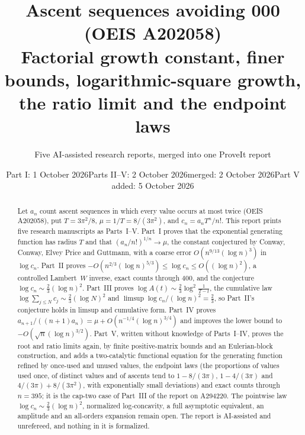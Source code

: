 \documentclass[11pt,letterpaper]{article}
\title{Ascent sequences avoiding 000 (OEIS A202058)\\[4pt]
\large Factorial growth constant, finer bounds, logarithmic-square growth,\\ the ratio limit and the endpoint laws}
\author{Five AI-assisted research reports, merged into one ProveIt report}
\date{Part I: 1 October 2026\quad Parts II--V: 2 October 2026\quad merged: 2 October 2026\quad Part V added: 5 October 2026}
\theoremstyle{remark}
\begin{document}
\hypersetup{pageanchor=false}
\maketitle
\begin{abstract}
Let $a_n$ count ascent sequences in which every value occurs at most twice (OEIS A202058), put $T=3\pi^2/8$, $\mu=1/T=8/(3\pi^2)$, and $c_n=a_nT^n/n!$. This report prints five research manuscripts as Parts~I--V. Part~I proves that the exponential generating function has radius $T$ and that $(a_n/n!)^{1/n}\to\mu$, the constant conjectured by Conway, Conway, Elvey Price and Guttmann, with a coarse error $O(n^{9/13}(\log n)^3)$ in $\log c_n$. Part~II proves $-O(n^{2/3}(\log n)^{5/3})\le\log c_n\le O((\log n)^2)$, a controlled Lambert~$W$ inverse, exact counts through $400$, and the conjecture $\log c_n\sim\frac23(\log n)^2$. Part~III proves $\log A(t)\sim\frac23\log^2\frac1{T-t}$, the cumulative law $\log\sum_{j\le N}c_j\sim\frac23(\log N)^2$ and $\limsup\log c_n/(\log n)^2=\frac23$, so Part~II's conjecture holds in limsup and cumulative form. Part~IV proves $a_{n+1}/((n+1)a_n)=\mu+O(n^{-1/4}(\log n)^{3/4})$ and improves the lower bound to $-O(\sqrt n(\log n)^{3/2})$. Part~V, written without knowledge of Parts~I--IV, proves the root and ratio limits again, by finite positive-matrix bounds and an Eulerian-block construction, and adds a two-catalytic functional equation for the generating function refined by once-used and unused values, the endpoint laws (the proportions of values used once, of distinct values and of ascents tend to $1-8/(3\pi)$, $1-4/(3\pi)$ and $4/(3\pi)+8/(3\pi^2)$, with exponentially small deviations) and exact counts through $n=395$; it is the cap-two case of Part~III of the report on A294220. The pointwise law $\log c_n\sim\frac23(\log n)^2$, normalized log-concavity, a full asymptotic equivalent, an amplitude and an all-orders expansion remain open. The report is AI-assisted and unrefereed, and nothing in it is formalized.
\end{abstract}
\hypersetup{pageanchor=true}
\setcounter{tocdepth}{1}
\tableofcontents
\newpage
\end{document}
